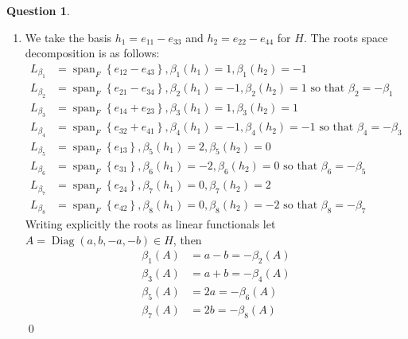 \documentclass[10.5pt]{article}
\theoremstyle{definition}
\newtheorem{pb}{Question}
\numberwithin{example}{subsection}
\numberwithin{proposition}{subsection}
\newcommand{\set}[1]{\left\{#1\right\}}
\begin{document}
\begin{pb}
\begin{enumerate}
            \item We take the basis \(h_1 = e_{11} - e_{33}\) and \(h_2 = e_{22} - e_{44}\) for \(H\). The roots space decomposition is as follows:
            \begin{align}
                L_{\beta_1} &= \operatorname{span}_F\set{e_{12} - e_{43}}, \beta_1(h_1) = 1, \beta_1(h_2) = -1 \\
                L_{\beta_2} &= \operatorname{span}_F\set{e_{21} - e_{34}}, \beta_2(h_1) = -1, \beta_2(h_2) = 1 \text{ so that } \beta_2 = -\beta_1 \\
                L_{\beta_3} &= \operatorname{span}_F\set{e_{14} + e_{23}}, \beta_3(h_1) = 1, \beta_3(h_2) = 1 \\
                L_{\beta_4} &= \operatorname{span}_F\set{e_{32} + e_{41}}, \beta_4(h_1) = -1, \beta_4(h_2) = -1 \text{ so that } \beta_4 = -\beta_3 \\
                L_{\beta_5} &= \operatorname{span}_F\set{e_{13}}, \beta_5(h_1) = 2, \beta_5(h_2) = 0 \\
                L_{\beta_6} &= \operatorname{span}_F\set{e_{31}}, \beta_6(h_1) = -2, \beta_6(h_2) = 0 \text{ so that } \beta_6 = -\beta_5\\
                L_{\beta_7} &= \operatorname{span}_F\set{e_{24}}, \beta_7(h_1) = 0, \beta_7(h_2) = 2 \\
                L_{\beta_8} &= \operatorname{span}_F\set{e_{42}}, \beta_8(h_1) = 0, \beta_8(h_2) = -2 \text{ so that } \beta_8 = -\beta_7
            \end{align}
            Writing explicitly the roots as linear functionals let \(A = \operatorname{Diag}(a,b,-a,-b) \in H\), then
            \begin{align}
                \beta_1(A) &= a - b = -\beta_2(A) \\
                \beta_3(A) &= a + b = -\beta_4(A) \\
                \beta_5(A) &= 2a = -\beta_6(A) \\
                \beta_7(A) &= 2b = -\beta_8(A)
            \end{align} \qed


\end{enumerate}
\end{pb}
\end{document}
